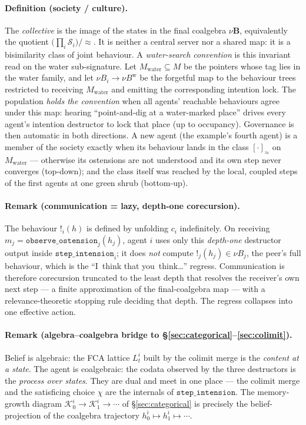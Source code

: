 \documentclass{article}
\newcommand{\method}[1]{\texttt{#1}}
\begin{document}
\paragraph{Definition (society / culture).}
The \emph{collective} is the image of the states in the final coalgebra
$\nu\mathbf{B}$, equivalently the quotient $\big(\prod_i\mathcal{S}_i\big)/\!\approx$.
It is neither a central server nor a shared map: it is a bisimilarity class of
joint behaviour. A \emph{water-search convention} is this invariant read on
the water sub-signature. Let $M_{\mathrm{water}}\subseteq M$ be the pointers
whose tag lies in the water family, and let
$\nu B_i\to\nu B^{\mathrm{w}}$ be the forgetful map to the behaviour trees
restricted to receiving $M_{\mathrm{water}}$ and emitting the corresponding
intention lock. The population \emph{holds the convention} when all agents'
reachable behaviours agree under this map: hearing ``point-and-dig at a
water-marked place'' drives every agent's intention destructor to lock that
place (up to occupancy). Governance is then automatic in both directions. A
new agent (the example's fourth agent) is a member of the society exactly
when its behaviour lands in the class $[\cdot]_{\approx}$ on
$M_{\mathrm{water}}$ --- otherwise its ostensions are not understood and its
own step never converges (top-down); and the class itself was reached by the
local, coupled steps of the first agents at one green shrub (bottom-up).

\paragraph{Remark (communication = lazy, depth-one corecursion).}
The behaviour $!_i(h)$ is defined by unfolding $c_i$ indefinitely. On
receiving $m_j=\method{observe\_ostension}_j(h_j)$, agent $i$ uses only this
\emph{depth-one} destructor output inside $\method{step\_intension}_i$; it
does \emph{not} compute $!_j(h_j)\in\nu B_j$, the peer's full behaviour, which
is the ``I~think that you~think\ldots'' regress. Communication is therefore
corecursion truncated to the least depth that resolves the receiver's own
next step --- a finite approximation of the final-coalgebra map --- with a
relevance-theoretic stopping rule \citep{sperber1995relevance} deciding that depth. The
regress collapses into one effective action.

\paragraph{Remark (algebra--coalgebra bridge to \S\ref{sec:categorical}--\ref{sec:colimit}).}
Belief is algebraic: the FCA lattice $L_t^i$ built by the colimit merge is
the \emph{content at a state}. The agent is coalgebraic: the codata observed
by the three destructors is the \emph{process over states}. They are dual and
meet in one place --- the colimit merge and the satisficing choice $\chi$ are
the internals of $\method{step\_intension}$. The memory-growth diagram
$\mathcal{K}_0^i\to\mathcal{K}_1^i\to\cdots$ of \S\ref{sec:categorical} is
precisely the belief-projection of the coalgebra trajectory
$h_0^i\mapsto h_1^i\mapsto\cdots$.
\end{document}
